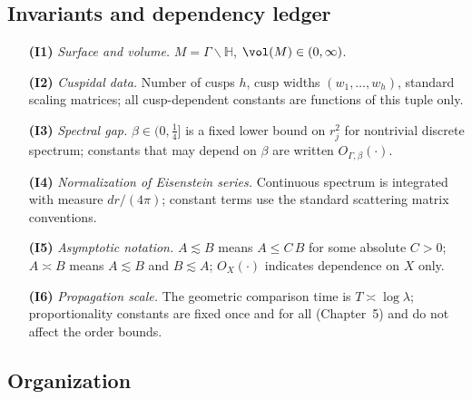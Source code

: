 \subsection*{Invariants and dependency ledger}

\begin{itemize}[leftmargin=2em]
  \item[\textbf{(I1)}] \textit{Surface and volume.} $M=\Gamma\backslash\mathbb{H}$,
  $\vol(M)\in(0,\infty)$.

  \item[\textbf{(I2)}] \textit{Cuspidal data.} Number of cusps $h$, cusp widths
  $(w_1,\dots,w_h)$, standard scaling matrices; all cusp-dependent constants
  are functions of this tuple only.

  \item[\textbf{(I3)}] \textit{Spectral gap.} $\beta\in(0,\tfrac14]$ is a fixed
  lower bound on $r_j^2$ for nontrivial discrete spectrum; constants that may
  depend on $\beta$ are written $O_{\Gamma,\beta}(\cdot)$.

  \item[\textbf{(I4)}] \textit{Normalization of Eisenstein series.} Continuous
  spectrum is integrated with measure $dr/(4\pi)$; constant terms use the
  standard scattering matrix conventions.

  \item[\textbf{(I5)}] \textit{Asymptotic notation.}
  $A\lesssim B$ means $A\le C\,B$ for some absolute $C>0$;
  $A\asymp B$ means $A\lesssim B$ and $B\lesssim A$;
  $O_X(\cdot)$ indicates dependence on $X$ only.

  \item[\textbf{(I6)}] \textit{Propagation scale.} The geometric comparison
  time is $T\asymp\log\lambda$; proportionality constants are fixed once
  and for all (Chapter~5) and do not affect the order bounds.
\end{itemize}

\subsection*{Organization}

